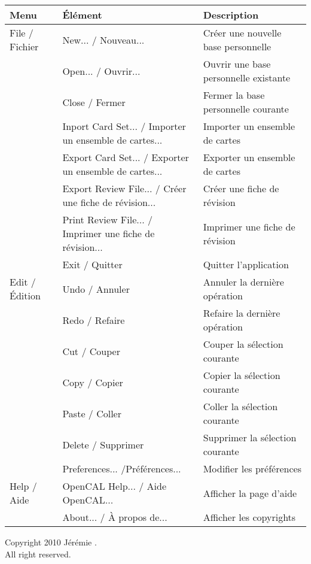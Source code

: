 \documentclass[pdftex,a4paper,11pt]{article}
\begin{document}
\begin{small}
\begin{tabular}{|p{}|p{}|p{}|}
    \hline
    Menu & Élément & Description\\
    \hline
    \hline
    File / Fichier & New... / Nouveau... & Créer une nouvelle base personnelle \\
    \cline{2-3}
                   & Open... / Ouvrir... & Ouvrir une base personnelle existante\\
    \cline{2-3}
                   & Close / Fermer      & Fermer la base personnelle courante\\
    \cline{2-3}
                   & Inport Card Set... / Importer un ensemble de cartes...   & Importer un ensemble de cartes \\
    \cline{2-3}                                                                                             
                   & Export Card Set... / Exporter un ensemble de cartes...   & Exporter un ensemble de cartes \\
    \cline{2-3}
                   & Export Review File... / Créer une fiche de révision...   & Créer une fiche de révision \\
    \cline{2-3}                                                                                                
                   & Print Review File... / Imprimer une fiche de révision... & Imprimer une fiche de révision \\
    \cline{2-3}
                   & Exit / Quitter & Quitter l'application \\
    \hline
    Edit / Édition & Undo / Annuler & Annuler la dernière opération \\
    \cline{2-3}
                   & Redo / Refaire & Refaire la dernière opération \\
    \cline{2-3}
                   & Cut / Couper   & Couper la sélection courante \\
    \cline{2-3}
                   & Copy / Copier  & Copier la sélection courante \\
    \cline{2-3}
                   & Paste / Coller & Coller la sélection courante \\
    \cline{2-3}
                   & Delete / Supprimer & Supprimer la sélection courante \\
    \cline{2-3}
                   & Preferences... /Préférences...    & Modifier les préférences \\
    \hline
    Help / Aide    & OpenCAL Help... / Aide OpenCAL... & Afficher la page d'aide \\
    \cline{2-3}
                   & About... / À propos de... & Afficher les copyrights \\
    \hline
\end{tabular}
\end{small}


\clearpage

\begin{center}
    Copyright \textcopyright{} 2010 Jérémie .\\
    All right reserved.
\end{center}
\end{document}
